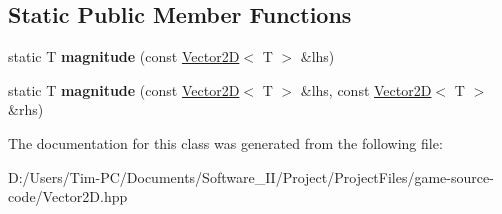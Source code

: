 \subsection*{Static Public Member Functions}
\begin{DoxyCompactItemize}
\item 
\mbox{\label{class_vector2_d_a8e8ba14195521bf6f0be330118cbd23b}} 
static T {\bfseries magnitude} (const \hyperlink{class_vector2_d}{Vector2D}$<$ T $>$ \&lhs)
\item 
\mbox{\label{class_vector2_d_af4af950a69d3e9bab0ace6195a3563da}} 
static T {\bfseries magnitude} (const \hyperlink{class_vector2_d}{Vector2D}$<$ T $>$ \&lhs, const \hyperlink{class_vector2_d}{Vector2D}$<$ T $>$ \&rhs)
\end{DoxyCompactItemize}


The documentation for this class was generated from the following file\+:\begin{DoxyCompactItemize}
\item 
D\+:/\+Users/\+Tim-\/\+P\+C/\+Documents/\+Software\+\_\+\+I\+I/\+Project/\+Project\+Files/game-\/source-\/code/Vector2\+D.\+hpp\end{DoxyCompactItemize}
